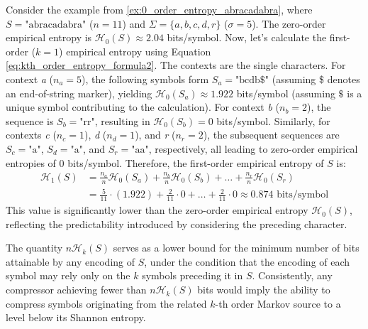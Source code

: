 \begin{example}
    Consider the example from \ref{ex:0_order_entropy_abracadabra}, where $S = \text{"abracadabra"}$ ($n=11$) and $\Sigma = \{a, b, c, d, r\}$ ($\sigma=5$). The zero-order empirical entropy is $\mathcal{H}_0(S) \approx 2.04$ bits/symbol. Now, let's calculate the first-order ($k=1$) empirical entropy using Equation \eqref{eq:kth_order_entropy_formula2}. The contexts are the single characters. For context \emph{a} ($n_a=5$), the following symbols form $S_a = \text{"bcdb\$"}$ (assuming \$ denotes an end-of-string marker), yielding $\mathcal{H}_0(S_a) \approx 1.922$ bits/symbol (assuming $\$$ is a unique symbol contributing to the calculation). For context \emph{b} ($n_b=2$), the sequence is $S_b = \text{"rr"}$, resulting in $\mathcal{H}_0(S_b) = 0$ bits/symbol. Similarly, for contexts \emph{c} ($n_c=1$), \emph{d} ($n_d=1$), and \emph{r} ($n_r=2$), the subsequent sequences are $S_c = \text{"a"}$, $S_d = \text{"a"}$, and $S_r = \text{"aa"}$, respectively, all leading to zero-order empirical entropies of 0 bits/symbol.
    Therefore, the first-order empirical entropy of $S$ is:
    \begin{align*}
        \mathcal{H}_1(S) & = \frac{n_a}{n}\mathcal{H}_0(S_a) + \frac{n_b}{n}\mathcal{H}_0(S_b) + \dots + \frac{n_r}{n}\mathcal{H}_0(S_r)        \\
                         & = \frac{5}{11} \cdot (1.922) + \frac{2}{11} \cdot 0 + \dots + \frac{2}{11} \cdot 0 \approx 0.874 \text{ bits/symbol}
    \end{align*}
    This value is significantly lower than the zero-order empirical entropy $\mathcal{H}_0(S)$, reflecting the predictability introduced by considering the preceding character.
\end{example}

\noindent The quantity $n \mathcal{H}_k(S)$ serves as a lower bound for the minimum number of bits attainable by any encoding of $S$, under the condition that the encoding of each symbol may rely only on the $k$ symbols preceding it in $S$. Consistently, any compressor achieving fewer than $n \mathcal{H}_k(S)$ bits would imply the ability to compress symbols originating from the related $k$-th order Markov source to a level below its Shannon entropy.


